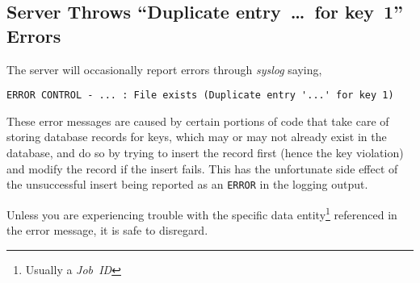 \subsection{\LB Server Throws ``Duplicate entry~\dots~for key~1'' Errors}

The \LB server will occasionally report errors through \emph{syslog} saying,

\begin{verbatim}
ERROR CONTROL - ... : File exists (Duplicate entry '...' for key 1) 
\end{verbatim}

These error messages are caused by certain portions of code that take care of storing database records for keys, which may or may not already exist in the database, and do so by trying to insert the record first (hence the key violation) and modify the record if the insert fails. This has the unfortunate side effect of the unsuccessful insert being reported as an \texttt{ERROR} in the logging output.

Unless you are experiencing trouble with the specific data entity\footnote{Usually a \emph{Job~ID}} referenced in the error message, it is safe to disregard.


